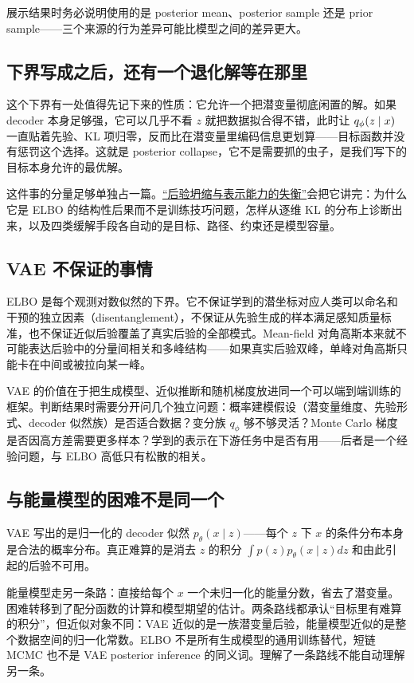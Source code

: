 展示结果时务必说明使用的是 posterior mean、posterior sample 还是 prior sample——三个来源的行为差异可能比模型之间的差异更大。

\subsection{下界写成之后，还有一个退化解等在那里}

这个下界有一处值得先记下来的性质：它允许一个把潜变量彻底闲置的解。如果 decoder 本身足够强，它可以几乎不看 \(z\) 就把数据拟合得不错，此时让 \(q_\phi(z\mid x)\) 一直贴着先验、KL 项归零，反而比在潜变量里编码信息更划算——目标函数并没有惩罚这个选择。这就是 posterior collapse，它不是需要抓的虫子，是我们写下的目标本身允许的最优解。

这件事的分量足够单独占一篇。\hyperref[sec:14-Deep-Learning/06-Variational-Autoencoders/03]{``后验坍缩与表示能力的失衡''}会把它讲完：为什么它是 ELBO 的结构性后果而不是训练技巧问题，怎样从逐维 KL 的分布上诊断出来，以及四类缓解手段各自动的是目标、路径、约束还是模型容量。

\subsection{VAE 不保证的事情}

ELBO 是每个观测对数似然的下界。它不保证学到的潜坐标对应人类可以命名和干预的独立因素（disentanglement），不保证从先验生成的样本满足感知质量标准，也不保证近似后验覆盖了真实后验的全部模式。Mean-field 对角高斯本来就不可能表达后验中的分量间相关和多峰结构——如果真实后验双峰，单峰对角高斯只能卡在中间或被拉向某一峰。

VAE 的价值在于把生成模型、近似推断和随机梯度放进同一个可以端到端训练的框架。判断结果时需要分开问几个独立问题：概率建模假设（潜变量维度、先验形式、decoder 似然族）是否适合数据？变分族 \(q_\phi\) 够不够灵活？Monte Carlo 梯度是否因高方差需要更多样本？学到的表示在下游任务中是否有用——后者是一个经验问题，与 ELBO 高低只有松散的相关。

\subsection{与能量模型的困难不是同一个}

VAE 写出的是归一化的 decoder 似然 \(p_\theta(x\mid z)\)——每个 \(z\) 下 \(x\) 的条件分布本身是合法的概率分布。真正难算的是消去 \(z\) 的积分 \(\int p(z)p_\theta(x\mid z)dz\) 和由此引起的后验不可用。

能量模型走另一条路：直接给每个 \(x\) 一个未归一化的能量分数，省去了潜变量。困难转移到了配分函数的计算和模型期望的估计。两条路线都承认``目标里有难算的积分''，但近似对象不同：VAE 近似的是一族潜变量后验，能量模型近似的是整个数据空间的归一化常数。ELBO 不是所有生成模型的通用训练替代，短链 MCMC 也不是 VAE posterior inference 的同义词。理解了一条路线不能自动理解另一条。
